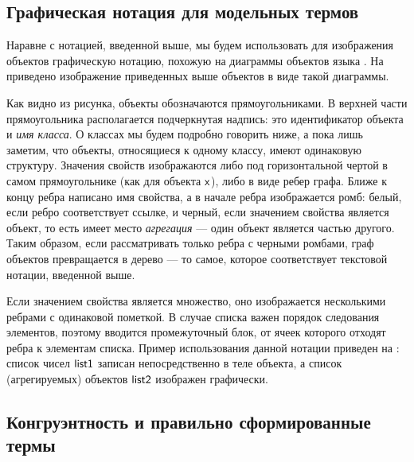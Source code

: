 \subsection{Графическая нотация для модельных термов}

Наравне с нотацией, введенной выше, мы будем использовать для изображения объектов графическую нотацию, похожую на диаграммы объектов языка  \cite{UML}. На  приведено изображение приведенных выше объектов в виде такой диаграммы.


Как видно из рисунка, объекты обозначаются прямоугольниками. В верхней части прямоугольника располагается подчеркнутая надпись: это идентификатор объекта и \emph{имя класса}. О классах мы будем подробно говорить ниже, а пока лишь заметим, что объекты, относящиеся к одному классу, имеют одинаковую структуру. Значения свойств изображаются либо под горизонтальной чертой в самом прямоугольнике (как для объекта $\mathsf{x}$), либо в виде ребер графа. Ближе к концу ребра написано имя свойства, а в начале ребра изображается ромб: белый, если ребро соответствует ссылке, и черный, если значением свойства является объект, то есть имеет место \emph{агрегация} --- один объект является частью другого. Таким образом, если рассматривать только ребра с черными ромбами, граф объектов превращается в дерево --- то самое, которое соответствует текстовой нотации, введенной выше.

Если значением свойства является множество, оно изображается несколькими ребрами с одинаковой пометкой. В случае списка важен порядок следования элементов, поэтому вводится промежуточный блок, от ячеек которого отходят ребра к элементам списка. Пример использования данной нотации приведен на : список чисел $\mathsf{list1}$ записан непосредственно в теле объекта, а список (агрегируемых) объектов $\mathsf{list2}$ изображен графически.


\subsection{Конгруэнтность и правильно сформированные термы}

